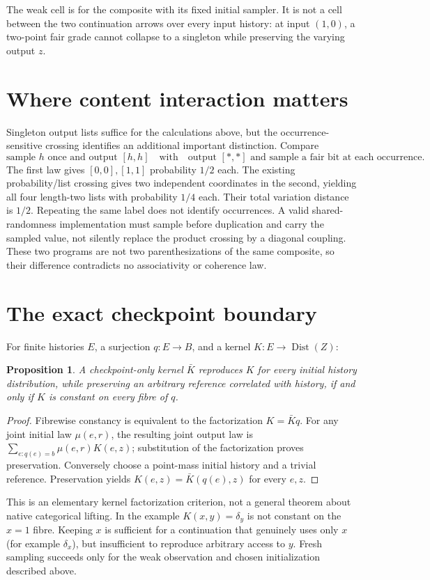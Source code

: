\documentclass[11pt]{article}
\newtheorem{proposition}{Proposition}
\begin{document}
The weak cell is for the composite with its fixed initial sampler. It is not a cell between the two continuation arrows over every input history: at input $(1,0)$, a two-point fair grade cannot collapse to a singleton while preserving the varying output $z$.

\section{Where content interaction matters}
Singleton output lists suffice for the calculations above, but the occurrence-sensitive crossing identifies an additional important distinction. Compare
\[
 \text{sample }h\text{ once and output }[h,h]
 \quad\text{with}\quad
 \text{output }[*,*]\text{ and sample a fair bit at each occurrence}.
\]
The first law gives $[0,0],[1,1]$ probability $1/2$ each. The existing probability/list crossing gives two independent coordinates in the second, yielding all four length-two lists with probability $1/4$ each. Their total variation distance is $1/2$. Repeating the same label does not identify occurrences. A valid shared-randomness implementation must sample before duplication and carry the sampled value, not silently replace the product crossing by a diagonal coupling. These two programs are not two parenthesizations of the same composite, so their difference contradicts no associativity or coherence law.

\section{The exact checkpoint boundary}
For finite histories $E$, a surjection $q:E\to B$, and a kernel $K:E\to\operatorname{Dist}(Z)$:
\begin{proposition}
A checkpoint-only kernel $\bar K$ reproduces $K$ for every initial history distribution, while preserving an arbitrary reference correlated with history, if and only if $K$ is constant on every fibre of $q$.
\end{proposition}
\begin{proof}
Fibrewise constancy is equivalent to the factorization $K=\bar Kq$. For any joint initial law $\mu(e,r)$, the resulting joint output law is $\sum_{e:q(e)=b}\mu(e,r)K(e,z)$; substitution of the factorization proves preservation. Conversely choose a point-mass initial history and a trivial reference. Preservation yields $K(e,z)=\bar K(q(e),z)$ for every $e,z$.
\end{proof}
This is an elementary kernel factorization criterion, not a general theorem about native categorical lifting. In the example $K(x,y)=\delta_y$ is not constant on the $x=1$ fibre. Keeping $x$ is sufficient for a continuation that genuinely uses only $x$ (for example $\delta_x$), but insufficient to reproduce arbitrary access to $y$. Fresh sampling succeeds only for the weak observation and chosen initialization described above.
\end{document}
